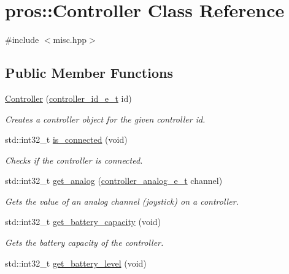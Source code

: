 \hypertarget{classpros_1_1Controller}{}\section{pros\+:\+:Controller Class Reference}
\label{classpros_1_1Controller}


{\ttfamily \#include $<$misc.\+hpp$>$}

\subsection*{Public Member Functions}
\begin{DoxyCompactItemize}
\item 
\hyperlink{classpros_1_1Controller_ae9d9ead11894048b383e9e82ef46d5ad}{Controller} (\hyperlink{misc_8h_af1323f00203099060d46f722b1fbd460}{controller\+\_\+id\+\_\+e\+\_\+t} id)
\begin{DoxyCompactList}\small\item\em Creates a controller object for the given controller id. \end{DoxyCompactList}\item 
std\+::int32\+\_\+t \hyperlink{classpros_1_1Controller_a1a013e9cf1979487f2daabcd729d3ecb}{is\+\_\+connected} (void)
\begin{DoxyCompactList}\small\item\em Checks if the controller is connected. \end{DoxyCompactList}\item 
std\+::int32\+\_\+t \hyperlink{classpros_1_1Controller_ace3038684aa3cf14f06279c54eeb1105}{get\+\_\+analog} (\hyperlink{misc_8h_a8bdd0963e2bc0d4fbe03435eee8a5ca5}{controller\+\_\+analog\+\_\+e\+\_\+t} channel)
\begin{DoxyCompactList}\small\item\em Gets the value of an analog channel (joystick) on a controller. \end{DoxyCompactList}\item 
std\+::int32\+\_\+t \hyperlink{classpros_1_1Controller_a7d85ecacfd46161ddb2be08d856ca130}{get\+\_\+battery\+\_\+capacity} (void)
\begin{DoxyCompactList}\small\item\em Gets the battery capacity of the controller. \end{DoxyCompactList}\item 
std\+::int32\+\_\+t \hyperlink{classpros_1_1Controller_a8fd8b131f13f2f7702b5299dab82fdaf}{get\+\_\+battery\+\_\+level} (void)

\end{DoxyCompactItemize}
